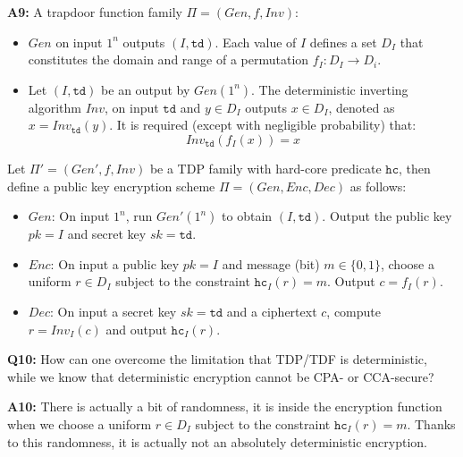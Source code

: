\documentclass[12pt,reqno]{amsart}
\newcommand{\code}[1]{\texttt{#1}}
\begin{document}
\textbf{A9:} A trapdoor function family $\Pi = (Gen, f, Inv)$:
\begin{itemize} 
\item $Gen$ on input $1^n$ outputs $(I, \code{td})$. Each value of $I$ defines a set $D_I$ that constitutes the domain and range of a permutation $f_I : D_I \to D_i$. 
\item Let $(I, \code{td})$ be an output by $Gen(1^n)$. The deterministic inverting algorithm $Inv$, on input $\code{td}$ and $y \in D_I$ outputs $x \in D_I$, denoted as $x = Inv_{\code{td}}(y)$. It is required (except with negligible probability) that:
$$
Inv_{\code{td}}(f_I(x)) = x
$$
\end{itemize} 
Let $\Pi' = (Gen', f, Inv)$ be a TDP family with hard-core predicate $\code{hc}$, then define a public key encryption scheme $\Pi = (Gen, Enc, Dec)$ as follows:
\begin{itemize} 
\item $Gen$: On input $1^n$, run $Gen'(1^n)$ to obtain $(I, \code{td})$. Output the public key $pk=I$ and secret key $sk=\code{td}$.
\item $Enc$: On input a public key $pk=I$ and message (bit) $m \in \{0, 1\}$, choose a uniform $r \in D_I$ subject to the constraint $\code{hc}_I(r)=m$. Output $c = f_I(r)$.
\item $Dec$: On input a secret key $sk=\code{td}$ and a ciphertext $c$, compute $r = Inv_I(c)$ and output $\code{hc}_I(r)$.
\end{itemize} 

\vspace{20px}
\textbf{Q10:} How can one overcome the limitation that TDP/TDF is deterministic, while we know that deterministic encryption cannot be CPA- or CCA-secure?

\textbf{A10:} There is actually a bit of randomness, it is inside the encryption function when we choose a uniform $r \in D_I$ subject to the constraint $\code{hc}_I(r)=m$. Thanks to this randomness, it is actually not an absolutely deterministic encryption. 
\end{document}
